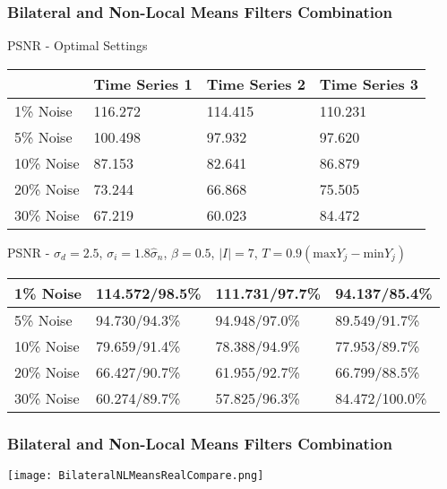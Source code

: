 \documentclass{beamer}
\begin{document}

\begin{frame}
\begin{center}
\frametitle{Bilateral and Non-Local Means Filters Combination}

\small{

PSNR - Optimal Settings

\begin{table}[h]
\begin{tabular}{l | l | l | l}
 & Time Series 1 & Time Series 2 & Time Series 3 \\ \hline
1\% Noise & 116.272 & 114.415 & 110.231 \\ \hline
5\% Noise & 100.498 & 97.932 & 97.620 \\ \hline
10\% Noise & 87.153 & 82.641 & 86.879 \\ \hline
20\% Noise & 73.244 & 66.868 & 75.505 \\ \hline
30\% Noise & 67.219 & 60.023 & 84.472
\end{tabular}
\end{table}

PSNR - $\sigma_d = 2.5$, $\sigma_i = 1.8 \hat{\sigma}_n$, $\beta = 0.5$, $\lvert I \rvert = 7$, $T = 0.9 \left( \mathrm{max} Y_j - \mathrm{min} Y_j \right)$

\begin{table}[h]
\begin{tabular}{l | l | l | l}
1\% Noise & 114.572/98.5\% & 111.731/97.7\% & 94.137/85.4\% \\ \hline
5\% Noise & 94.730/94.3\% & 94.948/97.0\% & 89.549/91.7\% \\ \hline
10\% Noise & 79.659/91.4\% & 78.388/94.9\% & 77.953/89.7\% \\ \hline
20\% Noise & 66.427/90.7\% & 61.955/92.7\% & 66.799/88.5\% \\ \hline
30\% Noise & 60.274/89.7\% & 57.825/96.3\% & 84.472/100.0\%
\end{tabular}
\end{table}

}

\end{center}
\end{frame}


\begin{frame}
\begin{center}
\frametitle{Bilateral and Non-Local Means Filters Combination}

\texttt{[image: BilateralNLMeansRealCompare.png]}

\end{center}
\end{frame}
\end{document}
